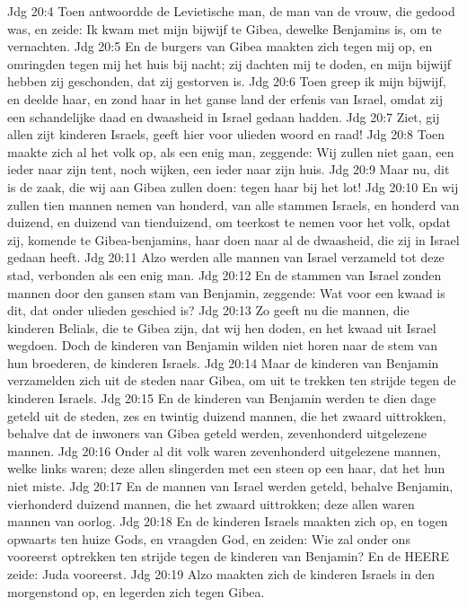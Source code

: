 Jdg 20:4  Toen antwoordde de Levietische man, de man van de vrouw, die gedood was, en zeide: Ik kwam met mijn bijwijf te Gibea, dewelke Benjamins is, om te vernachten.
Jdg 20:5  En de burgers van Gibea maakten zich tegen mij op, en omringden tegen mij het huis bij nacht; zij dachten mij te doden, en mijn bijwijf hebben zij geschonden, dat zij gestorven is.
Jdg 20:6  Toen greep ik mijn bijwijf, en deelde haar, en zond haar in het ganse land der erfenis van Israel, omdat zij een schandelijke daad en dwaasheid in Israel gedaan hadden.
Jdg 20:7  Ziet, gij allen zijt kinderen Israels, geeft hier voor ulieden woord en raad!
Jdg 20:8  Toen maakte zich al het volk op, als een enig man, zeggende: Wij zullen niet gaan, een ieder naar zijn tent, noch wijken, een ieder naar zijn huis.
Jdg 20:9  Maar nu, dit is de zaak, die wij aan Gibea zullen doen: tegen haar bij het lot!
Jdg 20:10  En wij zullen tien mannen nemen van honderd, van alle stammen Israels, en honderd van duizend, en duizend van tienduizend, om teerkost te nemen voor het volk, opdat zij, komende te Gibea-benjamins, haar doen naar al de dwaasheid, die zij in Israel gedaan heeft.
Jdg 20:11  Alzo werden alle mannen van Israel verzameld tot deze stad, verbonden als een enig man.
Jdg 20:12  En de stammen van Israel zonden mannen door den gansen stam van Benjamin, zeggende: Wat voor een kwaad is dit, dat onder ulieden geschied is?
Jdg 20:13  Zo geeft nu die mannen, die kinderen Belials, die te Gibea zijn, dat wij hen doden, en het kwaad uit Israel wegdoen. Doch de kinderen van Benjamin wilden niet horen naar de stem van hun broederen, de kinderen Israels.
Jdg 20:14  Maar de kinderen van Benjamin verzamelden zich uit de steden naar Gibea, om uit te trekken ten strijde tegen de kinderen Israels.
Jdg 20:15  En de kinderen van Benjamin werden te dien dage geteld uit de steden, zes en twintig duizend mannen, die het zwaard uittrokken, behalve dat de inwoners van Gibea geteld werden, zevenhonderd uitgelezene mannen.
Jdg 20:16  Onder al dit volk waren zevenhonderd uitgelezene mannen, welke links waren; deze allen slingerden met een steen op een haar, dat het hun niet miste.
Jdg 20:17  En de mannen van Israel werden geteld, behalve Benjamin, vierhonderd duizend mannen, die het zwaard uittrokken; deze allen waren mannen van oorlog.
Jdg 20:18  En de kinderen Israels maakten zich op, en togen opwaarts ten huize Gods, en vraagden God, en zeiden: Wie zal onder ons vooreerst optrekken ten strijde tegen de kinderen van Benjamin? En de HEERE zeide: Juda vooreerst.
Jdg 20:19  Alzo maakten zich de kinderen Israels in den morgenstond op, en legerden zich tegen Gibea.
